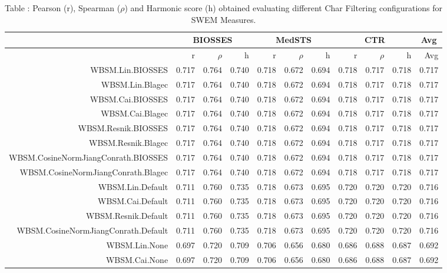 \begin{table}[!h]
\centering
\caption{Table \label{table:Preprocessing_charfiltering_WBSM}: Pearson (r), Spearman ($\rho$) and Harmonic score (h) obtained evaluating different Char Filtering configurations for SWEM Measures.} 
\begingroup\tiny
\begin{tabular}{rrrrrrrrrrr}
  \hline \multicolumn{1}{c}{ } & \multicolumn{3}{c}{BIOSSES} & \multicolumn{3}{c}{MedSTS} & \multicolumn{3}{c}{CTR} & \multicolumn{1}{c}{Avg} \\  \hline
 & r & $\rho$ & h & r & $\rho$ & h & r & $\rho$ & h & Avg \\ 
  \hline
WBSM.Lin.BIOSSES & 0.717 & 0.764 & 0.740 & 0.718 & 0.672 & 0.694 & 0.718 & 0.717 & 0.718 & 0.717 \\ 
  WBSM.Lin.Blagec & 0.717 & 0.764 & 0.740 & 0.718 & 0.672 & 0.694 & 0.718 & 0.717 & 0.718 & 0.717 \\ 
  WBSM.Cai.BIOSSES & 0.717 & 0.764 & 0.740 & 0.718 & 0.672 & 0.694 & 0.718 & 0.717 & 0.718 & 0.717 \\ 
  WBSM.Cai.Blagec & 0.717 & 0.764 & 0.740 & 0.718 & 0.672 & 0.694 & 0.718 & 0.717 & 0.718 & 0.717 \\ 
  WBSM.Resnik.BIOSSES & 0.717 & 0.764 & 0.740 & 0.718 & 0.672 & 0.694 & 0.718 & 0.717 & 0.718 & 0.717 \\ 
  WBSM.Resnik.Blagec & 0.717 & 0.764 & 0.740 & 0.718 & 0.672 & 0.694 & 0.718 & 0.717 & 0.718 & 0.717 \\ 
  WBSM.CosineNormJiangConrath.BIOSSES & 0.717 & 0.764 & 0.740 & 0.718 & 0.672 & 0.694 & 0.718 & 0.717 & 0.718 & 0.717 \\ 
  WBSM.CosineNormJiangConrath.Blagec & 0.717 & 0.764 & 0.740 & 0.718 & 0.672 & 0.694 & 0.718 & 0.717 & 0.718 & 0.717 \\ 
  WBSM.Lin.Default & 0.711 & 0.760 & 0.735 & 0.718 & 0.673 & 0.695 & 0.720 & 0.720 & 0.720 & 0.716 \\ 
  WBSM.Cai.Default & 0.711 & 0.760 & 0.735 & 0.718 & 0.673 & 0.695 & 0.720 & 0.720 & 0.720 & 0.716 \\ 
  WBSM.Resnik.Default & 0.711 & 0.760 & 0.735 & 0.718 & 0.673 & 0.695 & 0.720 & 0.720 & 0.720 & 0.716 \\ 
  WBSM.CosineNormJiangConrath.Default & 0.711 & 0.760 & 0.735 & 0.718 & 0.673 & 0.695 & 0.720 & 0.720 & 0.720 & 0.716 \\ 
  WBSM.Lin.None & 0.697 & 0.720 & 0.709 & 0.706 & 0.656 & 0.680 & 0.686 & 0.688 & 0.687 & 0.692 \\ 
  WBSM.Cai.None & 0.697 & 0.720 & 0.709 & 0.706 & 0.656 & 0.680 & 0.686 & 0.688 & 0.687 & 0.692 \\ 

\end{tabular}
\end{table}
